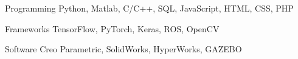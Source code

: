 


\begin{cvskills}


\cvskill
{Programming} %
{Python, Matlab, C/C++, SQL, JavaScript, HTML, CSS, PHP} %


\cvskill
{Frameworks} %
{TensorFlow, PyTorch, Keras, ROS, OpenCV} %


\cvskill
{Software} %
{Creo Parametric, SolidWorks, HyperWorks, GAZEBO} %


\end{cvskills}